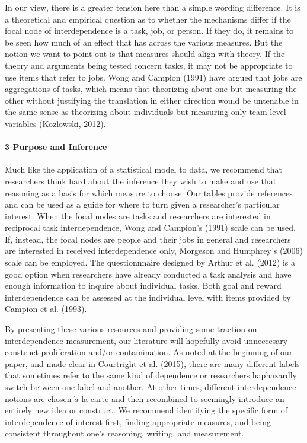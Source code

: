 \documentclass[english,,man]{apa6}
\let\oldparagraph\paragraph
\renewcommand{\paragraph}[1]{\oldparagraph{#1}\mbox{}}
\theoremstyle{definition}
\theoremstyle{definition}
\theoremstyle{definition}
\theoremstyle{remark}
\begin{document}
In our view, there is a greater tension here than a simple wording
difference. It is a theoretical and empirical question as to whether the
mechanisms differ if the focal node of interdependence is a task, job,
or person. If they do, it remains to be seen how much of an effect that
has across the various measures. But the notion we want to point out is
that measures should align with theory. If the theory and arguments
being tested concern tasks, it may not be appropriate to use items that
refer to jobs. Wong and Campion (1991) have argued that jobs are
aggregations of tasks, which means that theorizing about one but
measuring the other without justifying the translation in either
direction would be untenable in the same sense as theorizing about
individuals but measuring only team-level variables (Kozlowski, 2012).

\hypertarget{purpose-and-inference}{%
\paragraph{3 Purpose and Inference}\label{purpose-and-inference}}

Much like the application of a statistical model to data, we recommend
that researchers think hard about the inference they wish to make and
use that reasoning as a basis for which measure to choose. Our tables
provide references and can be used as a guide for where to turn given a
researcher's particular interest. When the focal nodes are tasks and
researchers are interested in reciprocal task interdependence, Wong and
Campion's (1991) scale can be used. If, instead, the focal nodes are
people and their jobs in general and researchers are interested in
received interdependence only, Morgeson and Humphrey's (2006) scale can
be employed. The questionnnaire designed by Arthur et al. (2012) is a
good option when researchers have already conducted a task analysis and
have enough information to inquire about individual tasks. Both goal and
reward interdependence can be assessed at the individual level with
items provided by Campion et al. (1993).

By presenting these various resources and providing some traction on
interdependence measurement, our literature will hopefully avoid
unneccesary construct proliferation and/or contamination. As noted at
the beginning of our paper, and made clear in Courtright et al. (2015),
there are many different labels that sometimes refer to the same kind of
dependence or researchers haphazardly switch between one label and
another. At other times, different interdependence notions are chosen
\(\grave{a}\) la carte and then recombined to seemingly introduce an
entirely new idea or construct. We recommend identifying the specific
form of interdependence of interest first, finding appropriate measures,
and being consistent throughout one's reasoning, writing, and
measurement.
\end{document}
